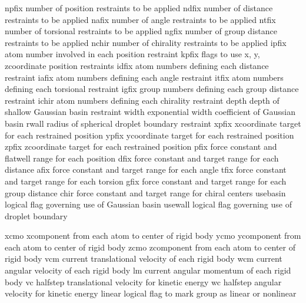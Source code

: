 \documentclass[letterpaper,11pt,english]{sphinxmanual}
\begin{document}
\begin{sphinxVerbatim}[commandchars=\\\{\}]
npfix           number of position restraints to be applied
ndfix           number of distance restraints to be applied
nafix           number of angle restraints to be applied
ntfix           number of torsional restraints to be applied
ngfix           number of group distance restraints to be applied
nchir           number of chirality restraints to be applied
ipfix           atom number involved in each position restraint
kpfix           flags to use x\PYGZhy{}, y\PYGZhy{}, z\PYGZhy{}coordinate position restraints
idfix           atom numbers defining each distance restraint
iafix           atom numbers defining each angle restraint
itfix           atom numbers defining each torsional restraint
igfix           group numbers defining each group distance restraint
ichir           atom numbers defining each chirality restraint
depth           depth of shallow Gaussian basin restraint
width           exponential width coefficient of Gaussian basin
rwall           radius of spherical droplet boundary restraint
xpfix           x\PYGZhy{}coordinate target for each restrained position
ypfix           y\PYGZhy{}coordinate target for each restrained position
zpfix           z\PYGZhy{}coordinate target for each restrained position
pfix            force constant and flat\PYGZhy{}well range for each position
dfix            force constant and target range for each distance
afix            force constant and target range for each angle
tfix            force constant and target range for each torsion
gfix            force constant and target range for each group distance
chir            force constant and target range for chiral centers
use\PYGZus{}basin       logical flag governing use of Gaussian basin
use\PYGZus{}wall        logical flag governing use of droplet boundary
\end{sphinxVerbatim}


\begin{sphinxVerbatim}[commandchars=\\\{\}]
xcmo            x\PYGZhy{}component from each atom to center of rigid body
ycmo            y\PYGZhy{}component from each atom to center of rigid body
zcmo            z\PYGZhy{}component from each atom to center of rigid body
vcm             current translational velocity of each rigid body
wcm             current angular velocity of each rigid body
lm              current angular momentum of each rigid body
vc              half\PYGZhy{}step translational velocity for kinetic energy
wc              half\PYGZhy{}step angular velocity for kinetic energy
linear          logical flag to mark group as linear or nonlinear
\end{sphinxVerbatim}
\end{document}
